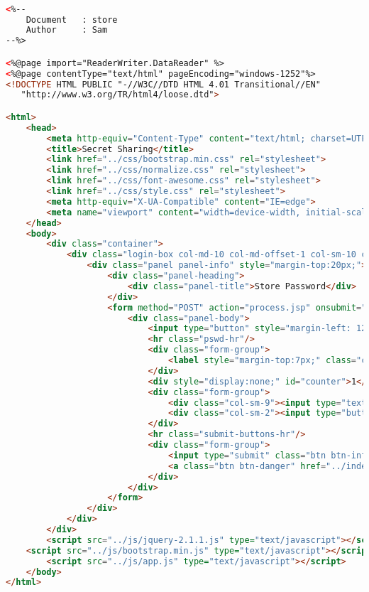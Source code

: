 \begin{lstlisting}[language=html,basicstyle=\tiny,caption=store.jsp]

<%-- 
    Document   : store
    Author     : Sam
--%>

<%@page import="ReaderWriter.DataReader" %>
<%@page contentType="text/html" pageEncoding="windows-1252"%>
<!DOCTYPE HTML PUBLIC "-//W3C//DTD HTML 4.01 Transitional//EN"
   "http://www.w3.org/TR/html4/loose.dtd">

<html>
    <head>
        <meta http-equiv="Content-Type" content="text/html; charset=UTF-8">
        <title>Secret Sharing</title>
        <link href="../css/bootstrap.min.css" rel="stylesheet">
        <link href="../css/normalize.css" rel="stylesheet">
        <link href="../css/font-awesome.css" rel="stylesheet">
        <link href="../css/style.css" rel="stylesheet">
        <meta http-equiv="X-UA-Compatible" content="IE=edge">
        <meta name="viewport" content="width=device-width, initial-scale=1">
    </head>
    <body>
        <div class="container">
            <div class="login-box col-md-10 col-md-offset-1 col-sm-10 col-sm-offset-1">
                <div class="panel panel-info" style="margin-top:20px;">
                    <div class="panel-heading">
                        <div class="panel-title">Store Password</div>
                    </div>
                    <form method="POST" action="process.jsp" onsubmit="return count()">
                        <div class="panel-body">
                            <input type="button" style="margin-left: 12px;" class="btn btn-primary" id="addPassword" value="Add Password"/>
                            <hr class="pswd-hr"/>
                            <div class="form-group">
                                <label style="margin-top:7px;" class="col-sm-7 control-label">Security Questions</label>
                            </div>
                            <div style="display:none;" id="counter">1</div>
                            <div class="form-group">
                                <div class="col-sm-9"><input type="text" id="question" class="form-control" placeholder="Question Here"/></div>
                                <div class="col-sm-2"><input type="button" id="add" class="btn btn-primary" value="Add"/></div>
                            </div>
                            <hr class="submit-buttons-hr"/>
                            <div class="form-group">
                                <input type="submit" class="btn btn-info" value="Store"/>
                                <a class="btn btn-danger" href="../index.jsp">Cancel</a>
                            </div>
                        </div>
                    </form>
                </div>
            </div>
        </div>
        <script src="../js/jquery-2.1.1.js" type="text/javascript"></script>
	<script src="../js/bootstrap.min.js" type="text/javascript"></script>
        <script src="../js/app.js" type="text/javascript"></script>
    </body>
</html>

\end{lstlisting}

